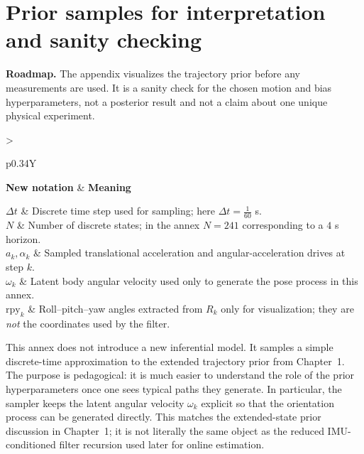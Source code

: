 \documentclass[11pt]{report}
\newcommand{\NotationTable}[1]{%
\vspace{0.6mm}
{\scriptsize
\setlength{\tabcolsep}{2.5pt}
\begin{tabularx}{\columnwidth}{>{\raggedright\arraybackslash}p{0.34\columnwidth}Y}
\toprule
\textbf{New notation} & \textbf{Meaning}\\
\midrule
#1\\
\bottomrule
\end{tabularx}}
\vspace{0.8mm}}
\newcommand{\ChapterRoadmap}[1]{%
\begin{center}
\begin{minipage}{0.94\textwidth}
\small\textbf{Roadmap.} #1
\end{minipage}
\end{center}
\vspace{1mm}}
\begin{document}
\clearpage
\appendix
\chapter{Prior samples for interpretation and sanity checking}
\ChapterRoadmap{The appendix visualizes the trajectory prior before any measurements are used. It is a sanity check for the chosen motion and bias hyperparameters, not a posterior result and not a claim about one unique physical experiment.}

\NotationTable{
$\Delta t$ & Discrete time step used for sampling; here $\Delta t=\tfrac{1}{60}$ s.\\
$N$ & Number of discrete states; in the annex $N=241$ corresponding to a $4$ s horizon.\\
$a_k,\alpha_k$ & Sampled translational acceleration and angular-acceleration drives at step $k$.\\
$\omega_k$ & Latent body angular velocity used only to generate the pose process in this annex.\\
$\mathrm{rpy}_k$ & Roll--pitch--yaw angles extracted from $R_k$ only for visualization; they are \emph{not} the coordinates used by the filter.}

This annex does not introduce a new inferential model. It samples a simple discrete-time approximation to the extended trajectory prior from Chapter~1. The purpose is pedagogical: it is much easier to understand the role of the prior hyperparameters once one sees typical paths they generate. In particular, the sampler keeps the latent angular velocity $\omega_k$ explicit so that the orientation process can be generated directly. This matches the extended-state prior discussion in Chapter~1; it is not literally the same object as the reduced IMU-conditioned filter recursion used later for online estimation.
\end{document}
